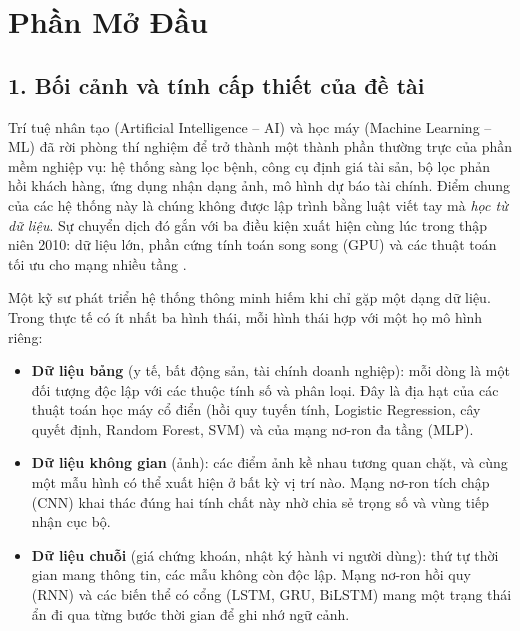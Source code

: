 \chapter*{Phần Mở Đầu}

\section*{1. Bối cảnh và tính cấp thiết của đề tài}

Trí tuệ nhân tạo (Artificial Intelligence -- AI) và học máy (Machine Learning -- ML) đã rời phòng thí nghiệm để
trở thành một thành phần thường trực của phần mềm nghiệp vụ: hệ thống sàng lọc bệnh, công cụ định giá tài sản,
bộ lọc phản hồi khách hàng, ứng dụng nhận dạng ảnh, mô hình dự báo tài chính. Điểm chung của các hệ thống này là
chúng không được lập trình bằng luật viết tay mà \emph{học từ dữ liệu}. Sự chuyển dịch đó gắn với ba điều kiện
xuất hiện cùng lúc trong thập niên 2010: dữ liệu lớn, phần cứng tính toán song song (GPU) và các thuật toán tối ưu
cho mạng nhiều tầng \cite{goodfellow2016}.

Một kỹ sư phát triển hệ thống thông minh hiếm khi chỉ gặp một dạng dữ liệu. Trong thực tế có ít nhất ba hình thái,
mỗi hình thái hợp với một họ mô hình riêng:

\begin{itemize}
  \item \textbf{Dữ liệu bảng} (y tế, bất động sản, tài chính doanh nghiệp): mỗi dòng là một đối tượng độc lập với
    các thuộc tính số và phân loại. Đây là địa hạt của các thuật toán học máy cổ điển (hồi quy tuyến tính,
    Logistic Regression, cây quyết định, Random Forest, SVM) và của mạng nơ-ron đa tầng (MLP).
  \item \textbf{Dữ liệu không gian} (ảnh): các điểm ảnh kề nhau tương quan chặt, và cùng một mẫu hình có thể xuất
    hiện ở bất kỳ vị trí nào. Mạng nơ-ron tích chập (CNN) khai thác đúng hai tính chất này nhờ chia sẻ trọng số
    và vùng tiếp nhận cục bộ.
  \item \textbf{Dữ liệu chuỗi} (giá chứng khoán, nhật ký hành vi người dùng): thứ tự thời gian mang thông tin, các
    mẫu không còn độc lập. Mạng nơ-ron hồi quy (RNN) và các biến thể có cổng (LSTM, GRU, BiLSTM) mang một trạng
    thái ẩn đi qua từng bước thời gian để ghi nhớ ngữ cảnh.
\end{itemize}

